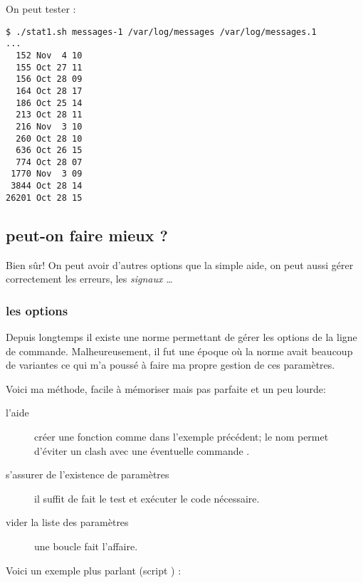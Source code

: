 On peut tester :

\begin{lstlisting}
$ ./stat1.sh messages-1 /var/log/messages /var/log/messages.1
...
  152 Nov  4 10
  155 Oct 27 11
  156 Oct 28 09
  164 Oct 28 17
  186 Oct 25 14
  213 Oct 28 11
  216 Nov  3 10
  260 Oct 28 10
  636 Oct 26 15
  774 Oct 28 07
 1770 Nov  3 09
 3844 Oct 28 14
26201 Oct 28 15
\end{lstlisting}

\subsection{peut-on faire mieux ?}
Bien sûr! On peut avoir d'autres options que la simple aide, on peut aussi gérer correctement les erreurs, les \emph{signaux \unix}\ldots

\subsubsection{les options}
Depuis longtemps il existe une norme \POSIX permettant de gérer les options de la ligne
de commande. Malheureusement, il fut une époque où la norme avait beaucoup de variantes
ce qui m'a poussé à faire ma propre gestion de ces paramètres.

Voici ma méthode, facile à mémoriser mais pas parfaite et un peu lourde:

\begin{description}
    \item[l'aide] créer une fonction  comme dans l'exemple précédent;
    le nom  permet d'éviter un clash avec une éventuelle commande .
    \item[s'assurer de l'existence de paramètres] il suffit de fait le test \code{[ \$\# -eq 0 ]} et
    exécuter le code nécessaire.
    \item[vider la liste des paramètres] une boucle  fait l'affaire.
\end{description}

Voici un exemple plus parlant (script ) :


